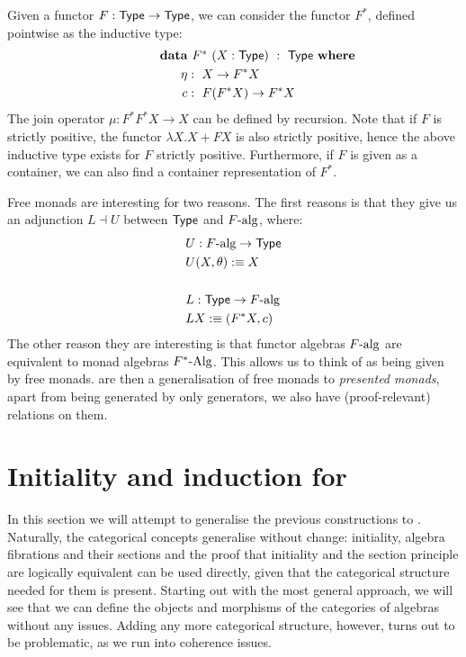 \documentclass[a4paper,10pt]{report}
\begin{document}
Given a functor $F : \mathsf{Type} \to \mathsf{Type}$, we can consider the functor
$F^*$, defined pointwise as the inductive type:
%
\begin{alignat*}{2}
  &\rlap{$\data\ F^*\ (X : \Type)\ :\ \Type\ \where$} \\
  &&\ \ \eta &:\ X \to F^* X \\
  &&\ \ c    &:\ F(F^*X) \to F^* X
\end{alignat*}
%
The join operator $\mu : F^*F^* X \to X$ can be defined by
recursion. Note that if $F$ is strictly positive, the functor
$\lambda X . X + FX$ is also strictly positive, hence the above
inductive type exists for $F$ strictly positive. Furthermore, if $F$
is given as a container, we can also find a container representation
of $F^*$.

Free monads are interesting for two reasons. The first reasons is that
they give us an adjunction $L \dashv U$ between $\mathsf{Type}$ and
$F\mbox{-alg}$, where:
%
\begin{align*}
  &U : F\mbox{-alg} \to \mathsf{Type} \\
  &U (X, \theta) :\equiv X \\
  &\\
  &L : \mathsf{Type} \to F\mbox{-alg} \\
  &L X :\equiv (F^* X, c)
\end{align*}
%
The other reason they are interesting is that functor algebras
$F\mbox{-alg}$ are equivalent to monad algebras $F^*\mbox{-Alg}$. This
allows us to think of \oits as being given by free monads. \Hits are
then a generalisation of free monads to \emph{presented monads}, \ie
apart from being generated by only generators, we also have
(proof-relevant) relations on them.

\chapter{Initiality and induction for \hits}
\label{sec:hits}

In this section we will attempt to generalise the previous
constructions to \hits. Naturally, the categorical concepts generalise
without change: initiality, algebra fibrations and their sections and
the proof that initiality and the section principle are logically
equivalent can be used directly, given that the categorical structure
needed for them is present. Starting out with the most general
approach, we will see that we can define the objects and morphisms of
the categories of algebras without any issues. Adding any more
categorical structure, however, turns out to be problematic, as we run
into coherence issues.
\end{document}
